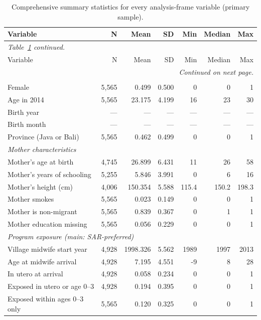 \begin{longtable}{lrrrrrr}
\caption{Comprehensive summary statistics for every analysis-frame variable (primary sample).}\label{tab:appendix_summary}\\
\toprule
Variable & N & Mean & SD & Min & Median & Max \\
\midrule
\endfirsthead
\multicolumn{7}{l}{\emph{Table~\ref{tab:appendix_summary} continued.}}\\
\toprule
Variable & N & Mean & SD & Min & Median & Max \\
\midrule
\endhead
\midrule
\multicolumn{7}{r}{\emph{Continued on next page.}}\\
\endfoot
\bottomrule
\endlastfoot
\multicolumn{7}{l}{\emph{Demographics and geography}} \\
Female & 5,565 & 0.499 & 0.500 & 0 & 0 & 1 \\
Age in 2014 & 5,565 & 23.175 & 4.199 & 16 & 23 & 30 \\
Birth year & --- & --- & --- & --- & --- & --- \\
Birth month & --- & --- & --- & --- & --- & --- \\
Province (Java or Bali) & 5,565 & 0.462 & 0.499 & 0 & 0 & 1 \\
\midrule
\multicolumn{7}{l}{\emph{Mother characteristics}} \\
Mother's age at birth & 4,745 & 26.899 & 6.431 & 11 & 26 & 58 \\
Mother's years of schooling & 5,255 & 5.846 & 3.991 & 0 & 6 & 16 \\
Mother's height (cm) & 4,006 & 150.354 & 5.588 & 115.4 & 150.2 & 198.3 \\
Mother smokes & 5,565 & 0.023 & 0.149 & 0 & 0 & 1 \\
Mother is non-migrant & 5,565 & 0.839 & 0.367 & 0 & 1 & 1 \\
Mother education missing & 5,565 & 0.056 & 0.229 & 0 & 0 & 1 \\
\midrule
\multicolumn{7}{l}{\emph{Program exposure (main: SAR-preferred)}} \\
Village midwife start year & 4,928 & 1998.326 & 5.562 & 1989 & 1997 & 2013 \\
Age at midwife arrival & 4,928 & 7.195 & 4.551 & -9 & 8 & 28 \\
In utero at arrival & 4,928 & 0.058 & 0.234 & 0 & 0 & 1 \\
Exposed in utero or age 0--3 & 4,928 & 0.194 & 0.395 & 0 & 0 & 1 \\
Exposed within ages 0--3 only & 5,565 & 0.120 & 0.325 & 0 & 0 & 1 \\

\end{longtable}
